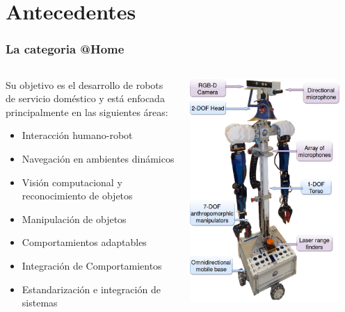 \documentclass[10pt,spanish,aspectratio=1610]{beamer}
\begin{document}
\section{Antecedentes}
\begin{frame}\frametitle{La categoria @Home}
  \begin{columns}
    \begin{column}{0.5\textwidth}
      Su objetivo es el desarrollo de robots de servicio doméstico y está enfocada principalmente en las siguientes áreas:
      \begin{itemize}
      \item Interacción humano-robot
      \item Navegación en ambientes dinámicos
      \item Visión computacional y reconocimiento de objetos
      \item Manipulación de objetos
      \item Comportamientos adaptables
      \item Integración de Comportamientos
      \item Estandarización e integración de sistemas
      \end{itemize}
    \end{column}
    \begin{column}{0.4\textwidth}
      \centering
      \includegraphics[width=0.9\textwidth]{Figures/Justina.pdf}
    \end{column}
  \end{columns}
\end{frame}
\end{document}
